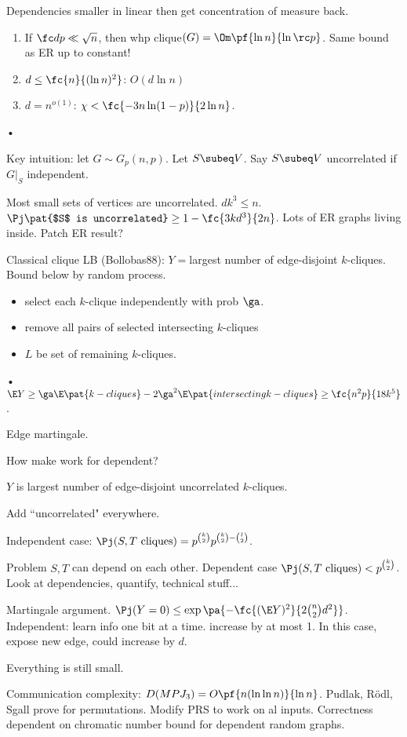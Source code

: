 Dependencies smaller in linear then get concentration of measure back. 

\begin{enumerate}
\item
If $\fc dp\ll \sqrt n$, then whp clique$(G)=\Om\pf{\ln n}{\ln \rc p}$. Same bound as ER up to constant!
\item
$d\le \fc{n}{(\ln n)^2}$: $O(d\ln n)$
\item
$d=n^{o(1)}$: $\chi<\fc{-3n\ln (1-p)}{2\ln n}$.
\end{enumerate}•

Key intuition: let $G\sim G_p(n,p)$. Let $S\subeq V$. Say $S\subeq V$ uncorrelated if $G|_S$ independent.

Most small sets of vertices are uncorrelated. $dk^3\le n$. $\Pj\pat{$S$ is uncorrelated}\ge 1-\fc{3kd^3}{2n}$. Lots of ER graphs living inside. Patch ER result?

Classical clique LB (Bollobas88): $Y=$largest number of edge-disjoint $k$-cliques. Bound below by random process.
\begin{itemize}
\item
select each $k$-clique independently with prob $\ga$.
\item
remove all pairs of selected intersecting $k$-cliques
\item
$L$ be set of remaining $k$-cliques.
\end{itemize}•
$\E Y \ge \ga\E\pat{k-cliques}-2\ga^2\E\pat{intersecting k-cliques}\ge\fc{n^2p}{18k^5}$.

Edge martingale.

How make work for dependent?

$Y$ is largest number of edge-disjoint uncorrelated $k$-cliques.

Add ``uncorrelated" everywhere.

Independent case: $\Pj(S,T\text{ cliques})=p^{\binom k2}p^{\binom k2-\binom l2}$.

Problem $S,T$ can depend on each other. Dependent case $\Pj(S,T\text{ cliques})<p^{\binom k2}$. Look at dependencies, quantify, technical stuff...

Martingale argument.  $\Pj(Y=0)\le \exp\pa{-\fc{(\E Y)^2}{2\binom n2 d^2}}$. Independent: learn info one bit at a time. increase by at most 1. In this case, expose new edge, could increase by $d$.

Everything is still small.

Communication complexity: $D(MPJ_3)=O\pf{n(\ln \ln n)}{\ln n}$. Pudlak, R\"odl, Sgall prove for permutations. Modify PRS to work on al inputs. Correctness dependent on chromatic number bound for dependent random graphs.

